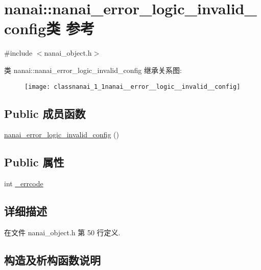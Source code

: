 \hypertarget{classnanai_1_1nanai__error__logic__invalid__config}{}\section{nanai\+:\+:nanai\+\_\+error\+\_\+logic\+\_\+invalid\+\_\+config类 参考}
\label{classnanai_1_1nanai__error__logic__invalid__config}


{\ttfamily \#include $<$nanai\+\_\+object.\+h$>$}

类 nanai\+:\+:nanai\+\_\+error\+\_\+logic\+\_\+invalid\+\_\+config 继承关系图\+:\begin{figure}[H]
\begin{center}
\leavevmode
\texttt{[image: classnanai\_1\_1nanai\_\_error\_\_logic\_\_invalid\_\_config]}
\end{center}
\end{figure}
\subsection*{Public 成员函数}
\begin{DoxyCompactItemize}
\item 
\hyperlink{classnanai_1_1nanai__error__logic__invalid__config_a438680feb6cf552fe30c2227286e2a3b}{nanai\+\_\+error\+\_\+logic\+\_\+invalid\+\_\+config} ()
\end{DoxyCompactItemize}
\subsection*{Public 属性}
\begin{DoxyCompactItemize}
\item 
int \hyperlink{classnanai_1_1nanai__error__logic__invalid__config_aaa8c31731609a42d9d3ba8f0def83aa1}{\+\_\+errcode}
\end{DoxyCompactItemize}


\subsection{详细描述}


在文件 nanai\+\_\+object.\+h 第 50 行定义.



\subsection{构造及析构函数说明}
\hypertarget{classnanai_1_1nanai__error__logic__invalid__config_a438680feb6cf552fe30c2227286e2a3b}{}
